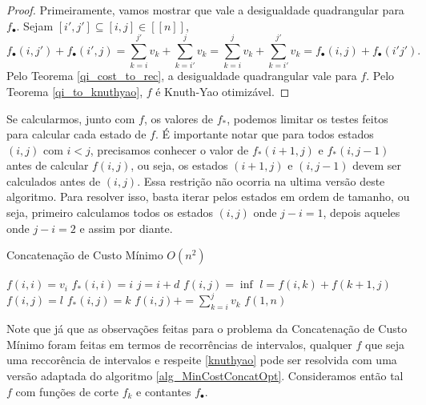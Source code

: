 \begin{proof}
Primeiramente, vamos mostrar que vale a desigualdade quadrangular para $f_\bullet$. Sejam $[i',j'] \subseteq [i,j] \in [[n]]$,
$$
f_\bullet(i,j') + f_\bullet(i',j) = 
\sum\limits_{k=i}^{j'} v_k + \sum\limits_{k=i'}^j v_k =
\sum\limits_{k=i}^j v_k + \sum\limits_{k=i'}^{j'} v_k =
f_\bullet(i,j) + f_\bullet(i'j') \text{.} 
$$
Pelo Teorema \ref{qi_cost_to_rec}, a desigualdade quadrangular vale para $f$. Pelo Teorema \ref{qi_to_knuthyao}, $f$ é Knuth-Yao otimizável.
\end{proof}

Se calcularmos, junto com $f$, os valores de $f_*$, podemos limitar os testes feitos para calcular cada estado de $f$. É importante notar que para todos estados $(i,j)$ com $i < j$, precisamos conhecer o valor de $f_*(i+1, j)$ e $f_*(i,j-1)$ antes de calcular $f(i,j)$, ou seja, os estados $(i+1,j)$ e $(i,j-1)$ devem ser calculados antes de $(i,j)$. Essa restrição não ocorria na ultima versão deste algoritmo. Para resolver isso, basta iterar pelos estados em ordem de tamanho, ou seja, primeiro calculamos todos os estados $(i,j)$ onde $j-i = 1$, depois aqueles onde $j-i = 2$ e assim por diante.

\begin{algorithm}[H]
\caption{Concatenação de Custo Mínimo $O(n^2)$}
\label{alg_MinCostConcatOpt}
\begin{algorithmic}[1]
        \State $f(i,i) = v_i$
        \State $f_*(i,i) = i$
    \EndFor
            \State $j = i+d$
            \State $f(i,j) = \inf$
                \State $l = f(i,k) + f(k+1,j)$
                    \State $f(i,j) = l$
                    \State $f_*(i,j) = k$
                \EndIf
            \EndFor
            \State $f(i,j) += \sum\limits_{k=i}^j v_k$
        \EndFor
    \EndFor
    \State \Return $f(1,n)$
\EndFunction
\end{algorithmic}
\end{algorithm}

Note que já que as observações feitas para o problema da Concatenação de Custo Mínimo foram feitas em termos de recorrências de intervalos, qualquer $f$ que seja uma reccorência de intervalos e respeite \ref{knuthyao} pode ser resolvida com uma versão adaptada do algoritmo \ref{alg_MinCostConcatOpt}. Consideramos então tal $f$ com funções de corte $f_k$ e contantes $f_\bullet$.

